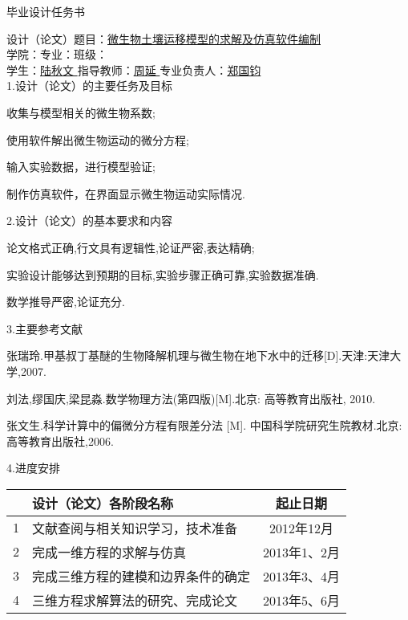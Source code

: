 \newpage
\pagestyle{empty}
{\pagestyle{empty}
\begin{center}
\heiti 毕业设计任务书
\end{center}

\setlength{\baselineskip}{25pt}
\noindent 设计（论文）题目：\uline{\hfill 微生物土壤运移模型的求解及仿真软件编制 \hfill} \\
\noindent 学院：\uline{\qquad}\quad 专业：\uline{\quad}\quad 班级：\uline{\hfill} \\
\noindent 学生：\uline{\hfill 陆秋文 \hfill}\quad 指导教师：\uline{\hfill 周延 \hfill} \quad 专业负责人：\uline{\hfill 郑国钧\hfill} \\
\noindent 1.设计（论文）的主要任务及目标\par
\begin{asparaenum}[(1)]
 \item 收集与模型相关的微生物系数;
 \item 使用软件解出微生物运动的微分方程;
 \item 输入实验数据，进行模型验证;
 \item 制作仿真软件，在界面显示微生物运动实际情况.
\end{asparaenum}
2.设计（论文）的基本要求和内容
\begin{asparaenum}[(1)]
 \item 论文格式正确,行文具有逻辑性,论证严密,表达精确;
 \item 实验设计能够达到预期的目标,实验步骤正确可靠,实验数据准确.
 \item 数学推导严密,论证充分.
\end{asparaenum}
3.主要参考文献
\begin{publist}
\item  张瑞玲.甲基叔丁基醚的生物降解机理与微生物在地下水中的迁移[D].天津:天津大学,2007.
\item  刘法,缪国庆,梁昆淼.数学物理方法(第四版)[M].北京: 高等教育出版社, 2010.
\item  张文生.科学计算中的偏微分方程有限差分法 [M]. 中国科学院研究生院教材.北京:高等教育出版社,2006.
\end{publist}
4.进度安排\vspace{\baselineskip}
\begin{center}
\begin{tabularx}{14cm}{|c|X|c|}
\hline
   & \centering 设计（论文）各阶段名称	& 起止日期 \\
\hline
 1 & 文献查阅与相关知识学习，技术准备   & 2012年12月 \\
\hline
 2 & 完成一维方程的求解与仿真          & 2013年1、2月 \\
 \hline
 3 & 完成三维方程的建模和边界条件的确定  & 2013年3、4月 \\
 \hline
 4 & 三维方程求解算法的研究、完成论文    & 2013年5、6月 \\
 \hline
\end{tabularx}
\end{center}
}
